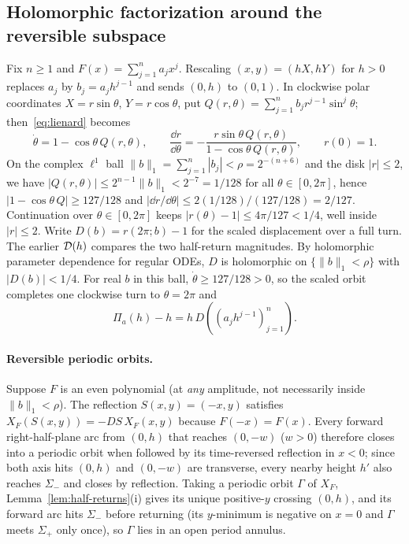 \subsection{Holomorphic factorization around the reversible subspace}\label{subsec:weak-factor}
Fix $n\ge 1$ and $F(x)=\sum_{j=1}^n a_j x^j$. Rescaling $(x,y)=(hX,hY)$ for $h>0$ replaces $a_j$ by $b_j=a_j h^{j-1}$ and sends $(0,h)$ to $(0,1)$. In clockwise polar coordinates $X=r\sin\theta$, $Y=r\cos\theta$, put $Q(r,\theta)=\sum_{j=1}^n b_j r^{j-1}\sin^j\theta$; then~\eqref{eq:lienard} becomes
\begin{equation}\label{eq:polar-ode}
  \dot\theta = 1 - \cos\theta\,Q(r,\theta),\qquad
  \frac{\dd r}{\dd\theta} = -\frac{r\sin\theta\,Q(r,\theta)}{1-\cos\theta\,Q(r,\theta)},\qquad r(0)=1.
\end{equation}
On the complex $\ell^1$ ball $\|b\|_1=\sum_{j=1}^n |b_j|<\rho=2^{-(n+6)}$ and the disk $|r|\le 2$, we have $|Q(r,\theta)|\le 2^{n-1}\|b\|_1<2^{-7}=1/128$ for all $\theta\in[0,2\pi]$, hence $|1-\cos\theta\,Q|\ge 127/128$ and $|\dd r/\dd\theta|\le 2(1/128)/(127/128)=2/127$. Continuation over $\theta\in[0,2\pi]$ keeps $|r(\theta)-1|\le 4\pi/127<1/4$, well inside $|r|\le 2$. Write $D(b)=r(2\pi;b)-1$ for the scaled displacement over a full turn.
The earlier $\mathcal{D}(h)$ compares the two half-return magnitudes.
By holomorphic parameter dependence for regular ODEs, $D$ is holomorphic on $\{\|b\|_1<\rho\}$ with $|D(b)|<1/4$. For real $b$ in this ball, $\dot\theta\ge 127/128>0$, so the scaled orbit completes one clockwise turn to $\theta=2\pi$ and
\begin{equation}\label{eq:disp-scale}
  \Pi_a(h) - h = h\,D\!\left((a_j h^{j-1})_{j=1}^n\right).
\end{equation}

\paragraph{Reversible periodic orbits.} Suppose $F$ is an even polynomial (at \emph{any} amplitude, not necessarily inside $\|b\|_1<\rho$). The reflection $S(x,y)=(-x,y)$ satisfies $X_F(S(x,y))=-DS\,X_F(x,y)$ because $F(-x)=F(x)$. Every forward right-half-plane arc from $(0,h)$ that reaches $(0,-w)$ ($w>0$) therefore closes into a periodic orbit when followed by its time-reversed reflection in $x<0$; since both axis hits $(0,h)$ and $(0,-w)$ are transverse, every nearby height $h'$ also reaches $\Sigma_-$ and closes by reflection. Taking a periodic orbit $\Gamma$ of $X_F$, Lemma~\ref{lem:half-returns}(i) gives its unique positive-$y$ crossing $(0,h)$, and its forward arc hits $\Sigma_-$ before returning (its $y$-minimum is negative on $x=0$ and $\Gamma$ meets $\Sigma_+$ only once), so $\Gamma$ lies in an open period annulus. 

